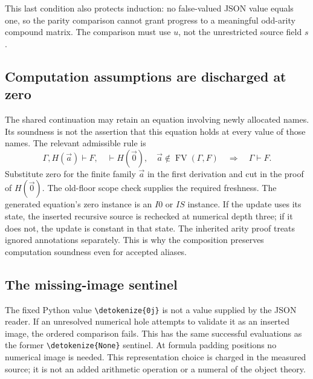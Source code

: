 \documentclass[11pt,letterpaper]{article}
\theoremstyle{definition}\newtheorem{definition}[theorem]{Definition}
\theoremstyle{remark}\newtheorem{remark}[theorem]{Remark}
\newcommand{\FV}{\operatorname{FV}}
\newcommand{\file}[1]{\expandafter\nolinkurl\expandafter{\detokenize{#1}}}
\begin{document}
This last condition also protects induction: no false-valued JSON value
equals one, so the parity comparison cannot grant progress to a meaningful
odd-arity compound matrix. The comparison must use $u$, not the unrestricted
source field $s$.

\subsection{Computation assumptions are discharged at zero}

The shared continuation may retain an equation involving newly allocated
names. Its soundness is not the assertion that this equation holds at every
value of those names. The relevant admissible rule is
\[
 \Gamma,H(\vec a)\vdash F,\quad \vdash H(\vec0),\quad
 \vec a\notin\FV(\Gamma,F)
 \quad\Longrightarrow\quad \Gamma\vdash F.
\]
Substitute zero for the finite family $\vec a$ in the first derivation and
cut in the proof of $H(\vec0)$. The old-floor scope check supplies the required
freshness. The generated equation's zero instance is an $I0$ or $IS$ instance.
If the update uses its state, the inserted recursive source is rechecked at
numerical depth three; if it does not, the update is constant in that state.
The inherited arity proof treats ignored annotations separately. This is why
the composition preserves computation soundness even for accepted aliases.

\subsection{The missing-image sentinel}

The fixed Python value \file{0j} is not a value supplied by the JSON reader.
If an unresolved numerical hole attempts to validate it as an inserted image,
the ordered comparison fails. This has the same successful evaluations as
the former \file{None} sentinel. At formula padding positions no numerical
image is needed. This representation choice is charged in the measured source;
it is not an added arithmetic operation or a numeral of the object theory.
\end{document}

